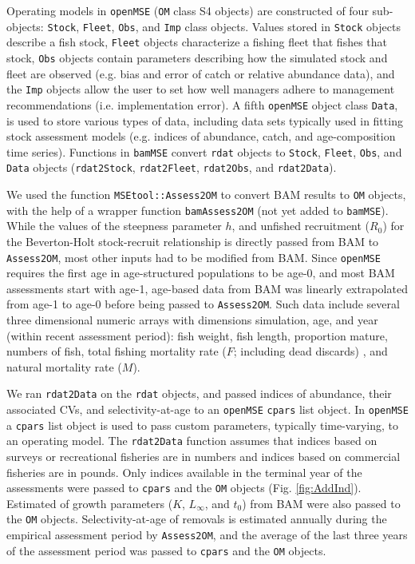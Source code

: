 \documentclass[12pt,english]{article}
\begin{document}
\begin{flushleft}
\begin{spacing}{1.9}
Operating models in \texttt{openMSE} (\texttt{OM} class S4 objects) are constructed of four sub-objects: \texttt{Stock}, \texttt{Fleet}, \texttt{Obs}, and \texttt{Imp} class objects. Values stored in \texttt{Stock} objects describe a fish stock, \texttt{Fleet} objects characterize a fishing fleet that fishes that stock, \texttt{Obs} objects contain parameters describing how the simulated stock and fleet are observed (e.g. bias and error of catch or relative abundance data), and the \texttt{Imp} objects allow the user to set how well managers adhere to management recommendations (i.e. implementation error). A fifth \texttt{openMSE} object class \texttt{Data}, is used to store various types of data, including data sets typically used in fitting stock assessment models (e.g. indices of abundance, catch, and age-composition time series). Functions in \texttt{bamMSE} convert \texttt{rdat} objects to \texttt{Stock}, \texttt{Fleet}, \texttt{Obs}, and \texttt{Data} objects (\texttt{rdat2Stock}, \texttt{rdat2Fleet}, \texttt{rdat2Obs}, and \texttt{rdat2Data}).

We used the function \texttt{MSEtool::Assess2OM} to convert BAM results to \texttt{OM} objects, with the help of a wrapper function \texttt{bamAssess2OM} (not yet added to \texttt{bamMSE}). While the values of the steepness parameter $h$, and unfished recruitment ($R_{0}$) for the Beverton-Holt stock-recruit relationship is directly passed from BAM to \texttt{Assess2OM}, most other inputs had to be modified from BAM. Since \texttt{openMSE} requires the first age in age-structured populations to be age-0, and most BAM assessments start with age-1, age-based data from BAM was linearly extrapolated from age-1 to age-0 before being passed to \texttt{Assess2OM}. Such data include several three dimensional numeric arrays with dimensions simulation, age, and year (within recent assessment period): fish weight, fish length, proportion mature, numbers of fish, total fishing mortality rate ($F$; including dead discards) , and natural mortality rate ($M$).

We ran  \texttt{rdat2Data} on the \texttt{rdat} objects, and passed indices of abundance, their associated CVs, and selectivity-at-age to an \texttt{openMSE} \texttt{cpars} list object. In \texttt{openMSE} a \texttt{cpars} list object is used to pass custom parameters, typically time-varying, to an operating model. The \texttt{rdat2Data} function assumes that indices based on surveys or recreational fisheries are in numbers and indices based on commercial fisheries are in pounds. Only indices available in the terminal year of the assessments were passed to \texttt{cpars} and the \texttt{OM} objects (Fig. \ref{fig:AddInd}). Estimated of growth parameters ($K$, $L_{\infty}$, and $t_{0}$) from BAM were also passed to the \texttt{OM} objects. Selectivity-at-age of removals is estimated annually during the empirical assessment period by \texttt{Assess2OM}, and the average of the last three years of the assessment period was passed to \texttt{cpars} and the \texttt{OM} objects.


\end{spacing}
\end{flushleft}
\end{document}
